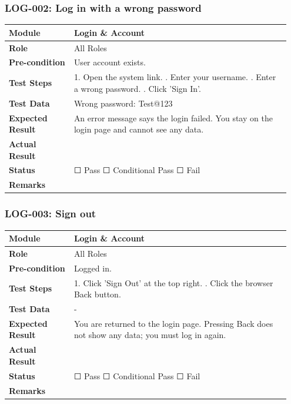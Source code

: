 \documentclass[10pt]{article}
\begin{document}
\subsubsection*{LOG-002: Log in with a wrong password}
\begin{longtable}{p{0.22\linewidth}p{0.73\linewidth}}
\hline
\textbf{Module} & Login \& Account \\ \hline
\textbf{Role} & All Roles \\ \hline
\textbf{Pre-condition} & User account exists. \\ \hline
\textbf{Test Steps} & 1. Open the system link. \newline 2. Enter your username. \newline 3. Enter a wrong password. \newline 4. Click 'Sign In'. \\ \hline
\textbf{Test Data} & Wrong password: Test@123 \\ \hline
\textbf{Expected Result} & An error message says the login failed. You stay on the login page and cannot see any data. \\ \hline
\textbf{Actual Result} & \newline \newline \\ \hline
\textbf{Status} & ☐ Pass \quad ☐ Conditional Pass \quad ☐ Fail \\ \hline
\textbf{Remarks} & \newline \\ \hline
\end{longtable}
\subsubsection*{LOG-003: Sign out}
\begin{longtable}{p{0.22\linewidth}p{0.73\linewidth}}
\hline
\textbf{Module} & Login \& Account \\ \hline
\textbf{Role} & All Roles \\ \hline
\textbf{Pre-condition} & Logged in. \\ \hline
\textbf{Test Steps} & 1. Click 'Sign Out' at the top right. \newline 2. Click the browser Back button. \\ \hline
\textbf{Test Data} & - \\ \hline
\textbf{Expected Result} & You are returned to the login page. Pressing Back does not show any data; you must log in again. \\ \hline
\textbf{Actual Result} & \newline \newline \\ \hline
\textbf{Status} & ☐ Pass \quad ☐ Conditional Pass \quad ☐ Fail \\ \hline
\textbf{Remarks} & \newline \\ \hline
\end{longtable}
\end{document}
